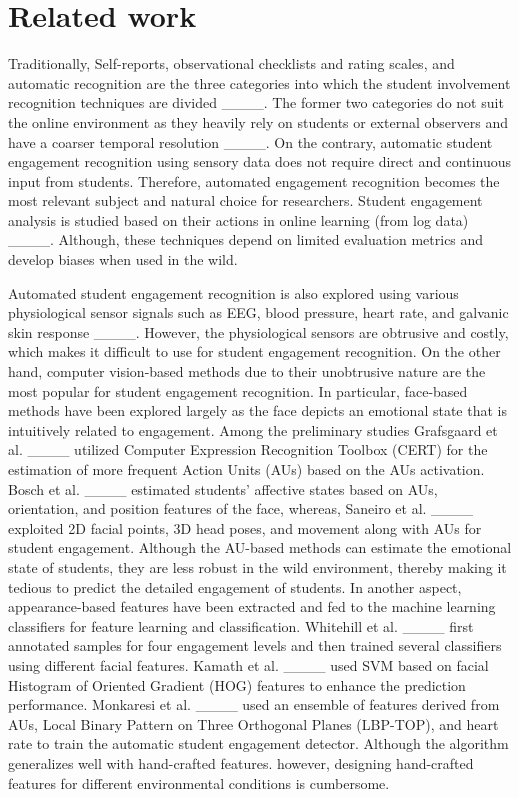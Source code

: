 \section{Related work}
\label{sec:Related work}
Traditionally, Self-reports, observational checklists and rating scales, and automatic recognition are the three categories into which the student involvement recognition techniques are divided ____. The former two categories do not suit the online environment as they heavily rely on students or external observers and have a coarser temporal resolution ____. On the contrary, automatic student engagement recognition using sensory data does not require direct and continuous input from students. Therefore, automated engagement recognition becomes the most relevant 
 subject and natural choice for researchers. Student engagement analysis is studied based on their actions in online learning  (from log data) ____. Although, these techniques depend on limited evaluation metrics and develop biases when used in the wild. 
 \par Automated student engagement recognition is also explored using various physiological sensor signals such as EEG, blood pressure, heart rate, and galvanic skin response ____. However, the physiological sensors are obtrusive and costly, which makes it difficult to use for student engagement recognition. On the other hand, computer vision-based methods due to their unobtrusive nature are the most popular for student engagement recognition. In particular, face-based methods have been explored largely as the face depicts an emotional state that is intuitively related to engagement. Among the preliminary studies Grafsgaard et al. ____ utilized Computer Expression Recognition Toolbox (CERT) for the estimation of more frequent Action Units (AUs) based on the AUs activation. Bosch et al. ____ estimated students' affective states based on AUs, orientation, and position features of the face, whereas, Saneiro et al. ____ exploited 2D facial points, 3D head poses, and movement along with AUs for student engagement. Although the AU-based methods can estimate the emotional state of students, they are less robust in the wild environment, thereby making it tedious to predict the detailed engagement of students. In another aspect, appearance-based features have been extracted and fed to the machine learning classifiers for feature learning and classification. Whitehill et al. ____ first annotated samples for four engagement levels and then trained several classifiers using different facial features. Kamath et al. ____ used SVM based on facial Histogram of Oriented Gradient (HOG) features to enhance the prediction performance. Monkaresi et al. ____ used an ensemble of features derived from AUs, Local Binary Pattern on Three Orthogonal Planes (LBP-TOP), and heart rate to train the automatic student engagement detector. Although the algorithm generalizes well with hand-crafted features. however, designing hand-crafted features for different environmental conditions is cumbersome.


